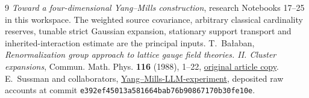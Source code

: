 
\begin{thebibliography}{9}
\emph{Toward a four-dimensional Yang--Mills construction},
research Notebooks 17--25 in this workspace.
The weighted source covariance, arbitrary classical cardinality
reserves, tunable strict Gaussian expansion, stationary support
transport and inherited-interaction estimate are the principal
inputs.
T.~Ba\l aban,
\emph{Renormalization group approach to lattice gauge field
theories. II. Cluster expansions},
Commun. Math. Phys. \textbf{116} (1988), 1--22,
\href{https://scispace.com/pdf/renormalization-group-approach-to-lattice-gauge-field-4penm4k7hc.pdf}{original article copy}.
E.~Sussman and collaborators,
\href{https://github.com/ethanwsussman/Yang--Mills-LLM-experiment}{Yang--Mills-LLM-experiment},
deposited raw accounts at commit
\texttt{e392ef45013a581664bab76b90867170b30fe10e}.
\end{thebibliography}

